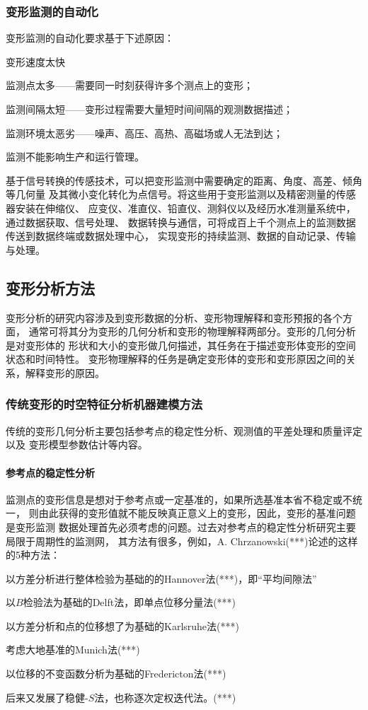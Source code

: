 \subsubsection*{变形监测的自动化}
变形监测的自动化要求基于下述原因：
\begin{asparaitem}[$\bullet$]
\item 变形速度太快
\item 监测点太多——需要同一时刻获得许多个测点上的变形；
\item 监测间隔太短——变形过程需要大量短时间间隔的观测数据描述；
\item 监测环境太恶劣——噪声、高压、高热、高磁场或人无法到达；
\item 监测不能影响生产和运行管理。
\end{asparaitem}
基于信号转换的传感技术，可以把变形监测中需要确定的距离、角度、高差、倾角等几何量
及其微小变化转化为点信号。将这些用于变形监测以及精密测量的传感器安装在伸缩仪、
应变仪、准直仪、铅直仪、测斜仪以及经历水准测量系统中，通过数据获取、信号处理、
数据转换与通信，可将成百上千个测点上的监测数据传送到数据终端或数据处理中心，
实现变形的持续监测、数据的自动记录、传输与处理。

\subsection{变形分析方法\cite{DEFORM03}}
变形分析的研究内容涉及到变形数据的分析、变形物理解释和变形预报的各个方面，
通常可将其分为变形的几何分析和变形的物理解释两部分。变形的几何分析是对变形体的
形状和大小的变形做几何描述，其任务在于描述变形体变形的空间状态和时间特性。
变形物理解释的任务是确定变形体的变形和变形原因之间的关系，解释变形的原因。

\subsubsection*{传统变形的时空特征分析机器建模方法}
传统的变形几何分析主要包括参考点的稳定性分析、观测值的平差处理和质量评定以及
变形模型参数估计等内容。
\paragraph*{参考点的稳定性分析} 
监测点的变形信息是想对于参考点或一定基准的，如果所选基准本省不稳定或不统一，
则由此获得的变形值就不能反映真正意义上的变形，因此，变形的基准问题是变形监测
数据处理首先必须考虑的问题。过去对参考点的稳定性分析研究主要局限于周期性的监测网，
其方法有很多，例如，A. Chrzanowski(***)论述的这样的5种方法：
\begin{asparaitem}[$\bullet$]
\item 以方差分析进行整体检验为基础的的Hannover法(***)，即“平均间隙法”
\item 以$B$检验法为基础的Delft法，即单点位移分量法(***)
\item 以方差分析和点的位移想了为基础的Karlsruhe法(***)
\item 考虑大地基准的Munich法(***)
\item 以位移的不变函数分析为基础的Fredericton法(***)
\end{asparaitem}
后来又发展了稳健-$S$法，也称逐次定权迭代法。(***)
